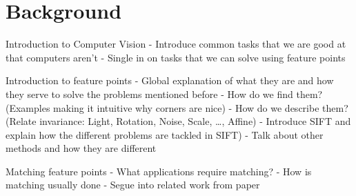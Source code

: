 \chapter{Background}

Introduction to Computer Vision
 - Introduce common tasks that we are good at that computers aren't
 - Single in on tasks that we can solve using feature points

Introduction to feature points
 - Global explanation of what they are and how they serve to solve the 
problems mentioned before
 - How do we find them? (Examples making it intuitive why corners are 
nice)
 - How do we describe them? (Relate invariance: Light, Rotation, Noise, 
 Scale, \ldots, Affine)
 - Introduce SIFT and explain how the different problems are tackled in 
SIFT)
 - Talk about other methods and how they are different

Matching feature points
 - What applications require matching?
 - How is matching usually done
 - Segue into related work from paper
